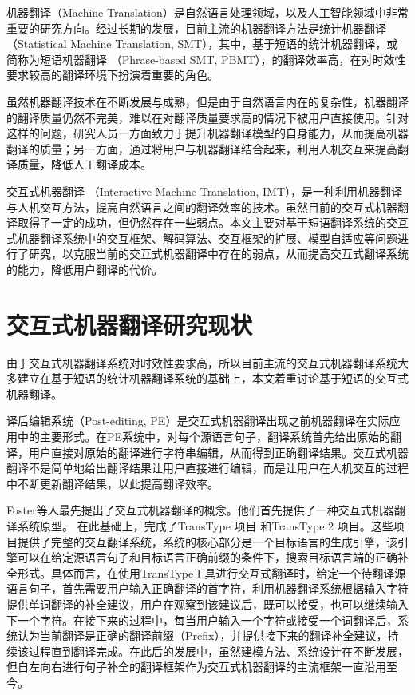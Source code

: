 \documentclass[master, winfont]{njuthesis}
\begin{document}
机器翻译（Machine Translation）是自然语言处理领域，以及人工智能领域中非常重要的研究方向。经过长期的发展，目前主流的机器翻译方法是统计机器翻译（Statistical Machine Translation, SMT），其中，基于短语的统计机器翻译，或简称为短语机器翻译 （Phrase-based SMT, PBMT），的翻译效率高，在对时效性要求较高的翻译环境下扮演着重要的角色。

虽然机器翻译技术在不断发展与成熟，但是由于自然语言内在的复杂性，机器翻译的翻译质量仍然不完美，难以在对翻译质量要求高的情况下被用户直接使用。针对这样的问题，研究人员一方面致力于提升机器翻译模型的自身能力，从而提高机器翻译的质量；另一方面，通过将用户与机器翻译结合起来，利用人机交互来提高翻译质量，降低人工翻译成本。

交互式机器翻译 （Interactive Machine Translation, IMT），是一种利用机器翻译与人机交互方法，提高自然语言之间的翻译效率的技术。虽然目前的交互式机器翻译取得了一定的成功，但仍然存在一些弱点。本文主要对基于短语翻译系统的交互式机器翻译系统中的交互框架、解码算法、交互框架的扩展、模型自适应等问题进行了研究，以克服当前的交互式机器翻译中存在的弱点，从而提高交互式翻译系统的能力，降低用户翻译的代价。

\section{交互式机器翻译研究现状}
\label{section:imtnow}
由于交互式机器翻译系统对时效性要求高，所以目前主流的交互式机器翻译系统大多建立在基于短语的统计机器翻译系统的基础上，本文着重讨论基于短语的交互式机器翻译。

译后编辑系统（Post-editing, PE）\cite{allen2003post}是交互式机器翻译出现之前机器翻译在实际应用中的主要形式。在PE系统中，对每个源语言句子，翻译系统首先给出原始的翻译，用户直接对原始的翻译进行字符串编辑，从而得到正确翻译结果。交互式机器翻译不是简单地给出翻译结果让用户直接进行编辑，而是让用户在人机交互的过程中不断更新翻译结果，以此提高翻译效率。

Foster等人\cite{foster1996word}最先提出了交互式机器翻译的概念。他们首先提供了一种交互式机器翻译系统原型\cite{foster1996word,foster1997target}。 在此基础上，完成了TransType 项目\cite{langlais2000transtype} 和TransType 2 项目\cite{foster2002user}。这些项目提供了完整的交互翻译系统，系统的核心部分是一个目标语言的生成引擎，该引擎可以在给定源语言句子和目标语言正确前缀的条件下，搜索目标语言端的正确补全形式。具体而言，在使用TransType工具进行交互式翻译时，给定一个待翻译源语言句子，首先需要用户输入正确翻译的首字符，利用机器翻译系统根据输入字符提供单词翻译的补全建议，用户在观察到该建议后，既可以接受，也可以继续输入下一个字符。在接下来的过程中，每当用户输入一个字符或接受一个词翻译后，系统认为当前翻译是正确的翻译前缀（Prefix），并提供接下来的翻译补全建议，持续该过程直到翻译完成。在此后的发展中，虽然建模方法、系统设计在不断发展，但自左向右进行句子补全的翻译框架作为交互式机器翻译的主流框架一直沿用至今。
\end{document}
